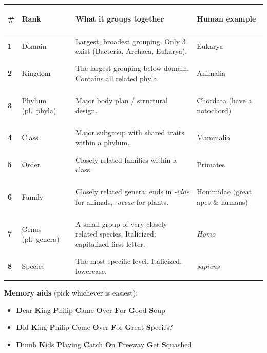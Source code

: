 \documentclass[11pt, letterpaper]{article}
\begin{document}
\noindent
{\renewcommand{\arraystretch}{1.6}
\begin{tabularx}{\textwidth}{>{\bfseries\centering\arraybackslash}p{1cm}
                              >{\bfseries\raggedright\arraybackslash}p{2.5cm}
                              >{\raggedright\arraybackslash}X
                              >{\itshape\raggedright\arraybackslash}p{4cm}}
\toprule
\rowcolor{tableheaderpurple}
\textbf{\#} & \textbf{Rank} & \textbf{What it groups together} & \textbf{Human example} \\
\midrule
\rowcolor{rowPu} 1 & Domain    & Largest, broadest grouping. Only 3 exist (Bacteria, Archaea, Eukarya). & Eukarya \\
\rowcolor{rowA}  2 & Kingdom   & The largest grouping below domain. Contains all related phyla. & Animalia \\
\rowcolor{rowPu} 3 & Phylum (pl.\ phyla) & Major body plan / structural design. & Chordata (have a notochord) \\
\rowcolor{rowA}  4 & Class     & Major subgroup with shared traits within a phylum. & Mammalia \\
\rowcolor{rowPu} 5 & Order     & Closely related families within a class. & Primates \\
\rowcolor{rowA}  6 & Family    & Closely related genera; ends in \emph{-idae} for animals, \emph{-aceae} for plants. & Hominidae (great apes \& humans) \\
\rowcolor{rowPu} 7 & Genus (pl.\ genera) & A small group of very closely related species. Italicized; capitalized first letter. & \textit{Homo} \\
\rowcolor{rowA}  8 & Species   & The most specific level. Italicized, lowercase. & \textit{sapiens} \\
\bottomrule
\end{tabularx}}

\textbf{Memory aids} (pick whichever is easiest):
\begin{itemize}[noitemsep]
  \item \textbf{D}ear \textbf{K}ing \textbf{P}hilip \textbf{C}ame \textbf{O}ver \textbf{F}or \textbf{G}ood \textbf{S}oup
  \item \textbf{D}id \textbf{K}ing \textbf{P}hilip \textbf{C}ome \textbf{O}ver \textbf{F}or \textbf{G}reat \textbf{S}pecies?
  \item \textbf{D}umb \textbf{K}ids \textbf{P}laying \textbf{C}atch \textbf{O}n \textbf{F}reeway \textbf{G}et \textbf{S}quashed
\end{itemize}
\end{document}
